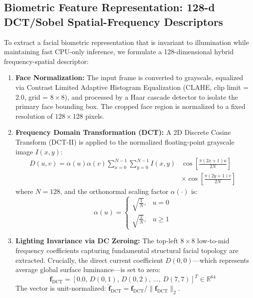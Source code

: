 \documentclass[conference]{IEEEtran}
\begin{document}
\subsection{Biometric Feature Representation: 128-d DCT/Sobel Spatial-Frequency Descriptors}
To extract a facial biometric representation that is invariant to illumination while maintaining fast CPU-only inference, we formulate a 128-dimensional hybrid frequency-spatial descriptor:
\begin{enumerate}
    \item \textbf{Face Normalization:} The input frame is converted to grayscale, equalized via Contrast Limited Adaptive Histogram Equalization (CLAHE, clip limit = 2.0, grid = $8 \times 8$), and processed by a Haar cascade detector to isolate the primary face bounding box. The cropped face region is normalized to a fixed resolution of $128 \times 128$ pixels.
    \item \textbf{Frequency Domain Transformation (DCT):} A 2D Discrete Cosine Transform (DCT-II) is applied to the normalized floating-point grayscale image $I(x, y)$:
    \begin{equation}
    \begin{split}
        D(u, v) = \alpha(u)\alpha(v) \sum_{x=0}^{N-1}\sum_{y=0}^{N-1} I(x, y) & \cos\left[\frac{\pi(2x+1)u}{2N}\right] \\
        & \times \cos\left[\frac{\pi(2y+1)v}{2N}\right]
    \end{split}
    \end{equation}
    where $N=128$, and the orthonormal scaling factor $\alpha(\cdot)$ is:
    \begin{equation}
        \alpha(u) = \begin{cases} 
        \sqrt{\frac{1}{N}}, & u = 0 \\ 
        \sqrt{\frac{2}{N}}, & u \ge 1 
        \end{cases}
    \end{equation}
    \item \textbf{Lighting Invariance via DC Zeroing:} The top-left $8 \times 8$ low-to-mid frequency coefficients capturing fundamental structural facial topology are extracted. Crucially, the direct current coefficient $D(0, 0)$—which represents average global surface luminance—is set to zero:
    \begin{equation}
        \mathbf{f}_{\text{DCT}} = \left[0.0, \, D(0, 1), \, D(0, 2), \, \dots, \, D(7, 7)\right]^T \in \mathbb{R}^{64}
    \end{equation}
    The vector is unit-normalized: $\hat{\mathbf{f}}_{\text{DCT}} = \mathbf{f}_{\text{DCT}} / \|\mathbf{f}_{\text{DCT}}\|_2$.

\end{enumerate}
\end{document}
